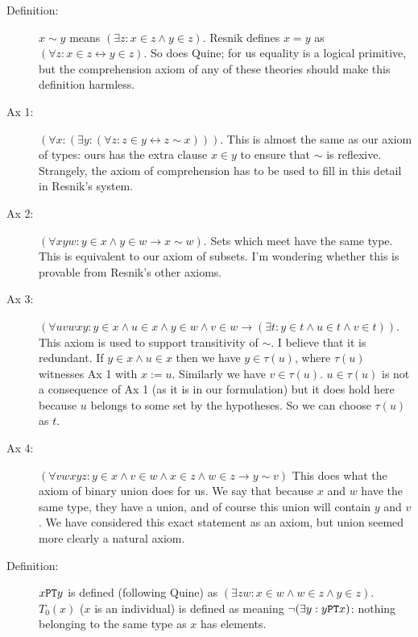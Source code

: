 \documentclass[12pt]{article}
\begin{document}
\begin{description}

\item[Definition:]  $x \sim y$ means $(\exists z:x \in z \wedge y \in z)$.  Resnik defines
$x=y$ as $(\forall z:x \in z \leftrightarrow y \in z)$.  So does Quine; for us equality is a logical primitive, but the comprehension axiom
of any of these theories should make this definition harmless.

\item[Ax 1:]  $(\forall x:(\exists y:(\forall z:z \in y \leftrightarrow z \sim x)))$.  This is almost the same as our axiom of types:  ours has the extra clause $x \in y$ to ensure that $\sim$ is reflexive.  Strangely, the axiom of comprehension has to be used to fill in this detail in Resnik's system.

\item[Ax 2:] $(\forall xyw:y \in x \wedge y \in w \rightarrow x \sim w)$.  Sets which meet have the same type.   This is equivalent to our axiom of subsets.  I'm wondering whether this is provable from Resnik's other axioms.  

\item[Ax 3:]  $(\forall uvwxy:  y \in x \wedge u \in x \wedge y \in w \wedge v \in w \rightarrow (\exists t:y \in t \wedge u \in t \wedge v \in t))$.  This axiom is used to support transitivity of $\sim$.  I believe that it is redundant.  If $y \in x \wedge u \in x$ then we have $y \in \tau(u)$, where $\tau(u)$ witnesses
Ax 1 with $x := u$.  Similarly we have $v \in \tau(u)$.  $u \in \tau(u)$ is not a consequence of Ax 1 (as it is in our formulation) but it does hold here because
$u$ belongs to some set by the hypotheses.  So we can choose $\tau(u)$ as $t$.

\item[Ax 4:]  $(\forall vwxyz:y \in x \wedge v \in w \wedge x \in z \wedge w \in z \rightarrow y \sim v)$  This does what the axiom of binary union does for us.  We say that because $x$ and $w$ have the same type, they have a union, and of course this union will contain $y$ and $v$.  We have considered this exact statement as an axiom, but union seemed more clearly a natural axiom.

\item[Definition:]  $x {\tt PT} y$ is defined (following Quine) as $(\exists zw:x \in w \wedge w \in z \wedge y \in z)$.  $T_0(x)$ ($x$ is an individual)
is defined as meaning $\neg(\exists y:y {\tt PT} x)$:  nothing belonging to the same type as $x$ has elements.


\end{description}
\end{document}
